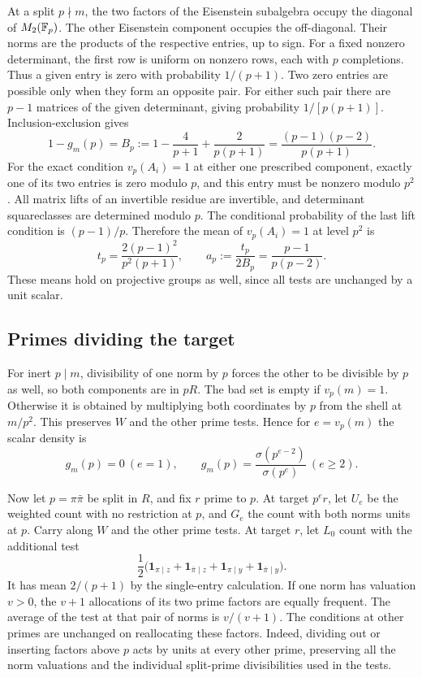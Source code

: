 At a split \(p\nmid m\), the two factors of the Eisenstein
subalgebra occupy the diagonal of \(M_2(\mathbb F_p)\). The other
Eisenstein component occupies the off-diagonal. Their norms are
the products of the respective entries, up to sign.
For a fixed nonzero determinant, the first row is uniform on
nonzero rows, each with \(p\) completions. Thus a given entry is
zero with probability \(1/(p+1)\). Two zero entries are possible
only when they form an opposite pair. For either such pair there
are \(p-1\) matrices of the given determinant, giving probability
\(1/[p(p+1)]\). Inclusion-exclusion gives
\begin{equation}\label{eq:B}
1-g_m(p)=B_p:=1-\frac4{p+1}+\frac2{p(p+1)}
             =\frac{(p-1)(p-2)}{p(p+1)}.
\end{equation}
For the exact condition \(v_p(A_i)=1\) at either one prescribed
component, exactly one of its two entries is zero modulo \(p\),
and this entry must be nonzero modulo \(p^2\). All matrix lifts of
an invertible residue are invertible, and determinant squareclasses
are determined modulo \(p\). The conditional probability of the
last lift condition is \((p-1)/p\). Therefore the mean of
\(v_p(A_i)=1\) at level \(p^2\) is
\begin{equation}\label{eq:t}
 t_p=\frac{2(p-1)^2}{p^2(p+1)},\qquad
 a_p:=\frac{t_p}{2B_p}=\frac{p-1}{p(p-2)} .
\end{equation}
These means hold on projective groups as well, since all tests
are unchanged by a unit scalar.

\subsection{Primes dividing the target}
For inert \(p\mid m\), divisibility of one norm by \(p\) forces
the other to be divisible by \(p\) as well, so both components
are in \(pR\). The bad set is empty if \(v_p(m)=1\).
Otherwise it is obtained by multiplying both coordinates by \(p\)
from the shell at \(m/p^2\). This preserves \(W\) and the other
prime tests. Hence for \(e=v_p(m)\) the scalar density is
\begin{equation}\label{eq:inert}
g_m(p)=0\ (e=1),\qquad
g_m(p)=\frac{\sigma(p^{e-2})}{\sigma(p^e)}\ (e\ge2).
\end{equation}

Now let \(p=\pi\bar\pi\) be split in \(R\), and fix \(r\) prime
to \(p\). At target \(p^e r\), let \(U_e\) be the weighted count
with no restriction at \(p\), and \(G_e\) the count with both
norms units at \(p\). Carry along \(W\) and the other prime
tests. At target \(r\), let \(L_0\) count with the additional
test
\[
 \frac12\bigl(\mathbf1_{\pi\mid z}+\mathbf1_{\bar\pi\mid z}
        +\mathbf1_{\pi\mid y}+\mathbf1_{\bar\pi\mid y}\bigr).
\]
It has mean \(2/(p+1)\) by the single-entry calculation.
If one norm has valuation \(v>0\), the \(v+1\) allocations of its
two prime factors are equally frequent. The average of the test
at that pair of norms is \(v/(v+1)\). The conditions at other
primes are unchanged on reallocating these factors. Indeed,
dividing out or inserting factors above \(p\) acts by units at
every other prime, preserving all the norm valuations and the
individual split-prime divisibilities used in the tests.

